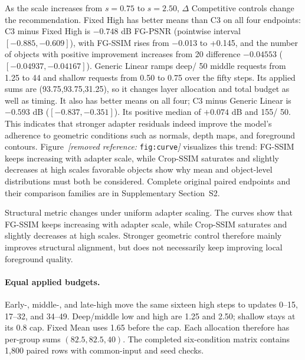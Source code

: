 \documentclass[times,twocolumn,final]{elsarticle}
\providecommand{\DIFadd}[1]{{\protect\color{blue} \sf #1}} %
\providecommand{\DIFdel}[1]{{\protect\color{red} \scriptsize #1}} %
\providecommand{\DIFaddbegin}{} %
\providecommand{\DIFaddend}{} %
\providecommand{\DIFdelbegin}{} %
\providecommand{\DIFdelend}{} %
\providecommand{\DIFdelFL}[1]{\DIFdel{#1}} %
\begin{document}
\DIFdelbegin \DIFdel{As the scale increases from $s = 0.75$ to $s = 2.50$, $\Delta$}\DIFdelend \DIFaddbegin \DIFadd{Competitive controls change the recommendation. Fixed High has better means than C3 on all four endpoints: C3 minus Fixed High is $-0.748$ dB FG-PSNR (pointwise interval $[-0.885,-0.609]$), with }\DIFaddend FG-SSIM \DIFdelbegin \DIFdel{rises from $-$0.013 to +0.145, and the number of objects with positive improvement increases from 20}\DIFdelend \DIFaddbegin \DIFadd{difference $-0.04553$ ($[-0.04937,-0.04167]$). Generic Linear ramps deep}\DIFaddend /\DIFdelbegin \DIFdel{50 }\DIFdelend \DIFaddbegin \DIFadd{middle requests from 1.25 }\DIFaddend to \DIFdelbegin \DIFdel{44}\DIFdelend \DIFaddbegin \DIFadd{2.50 and shallow requests from 0.50 to 0.75 over the fifty steps. Its applied sums are (93.75,93.75,31.25), so it changes layer allocation and total budget as well as timing. It also has better means on all four; C3 minus Generic Linear is $-0.593$ dB ($[-0.837,-0.351]$). Its positive median of $+0.074$ dB and 155}\DIFaddend /\DIFdelbegin \DIFdel{50. This indicates that stronger adapter residuals indeed improve the model's adherence to geometric conditions such as normals, depth maps, and foreground contours. Figure~\textit{[removed reference: }\texttt{fig:curve}\textit{]} visualizes this trend: FG-SSIM keeps increasing with adapter scale, while Crop-SSIM saturates and slightly decreases at high scales}\DIFdelend \DIFaddbegin \DIFadd{300 favorable objects show why mean and object-level distributions must both be considered. Complete original paired endpoints and their comparison families are in Supplementary Section~S2}\DIFaddend .

\DIFdelbegin %
{%
\DIFdelFL{Structural metric changes under uniform adapter scaling. The curves show that FG-SSIM keeps increasing with adapter scale, while Crop-SSIM saturates and slightly decreases at high scales. Stronger geometric control therefore mainly improves structural alignment, but does not necessarily keep improving local foreground quality.}}
\DIFdelend \DIFaddbegin \paragraph{Equal applied budgets.}
\label{subsec:matched-budget300}
\DIFadd{Early-, middle-, and late-high move the same sixteen high steps to updates 0--15, 17--32, and 34--49. Deep/middle low and high are 1.25 and 2.50; shallow stays at its 0.8 cap. Fixed Mean uses 1.65 before the cap. Each allocation therefore has per-group sums $(82.5,82.5,40)$. The completed six-condition matrix contains 1,800 paired rows with common-input and seed checks.
}\DIFaddend 
\end{document}
